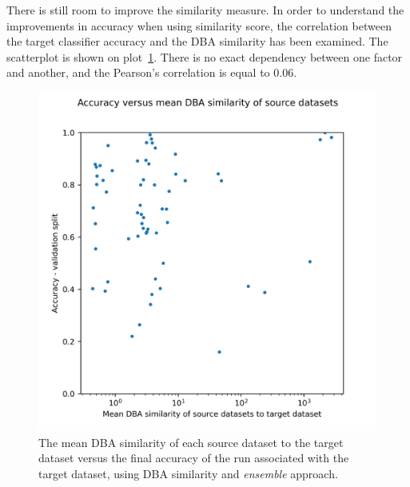 \documentclass[a4paper,11pt,twoside]{report}
\theoremstyle{definition}
\begin{document}
\FloatBarrier
There is still room to improve the similarity measure. In order to understand the improvements in accuracy when using similarity score, the correlation between the target classifier accuracy and the DBA similarity has been examined. The scatterplot is shown on plot~\ref{fig:acc_vs_dba_sim}. There is no exact dependency between one factor and another, and the Pearson's correlation is equal to $0.06$.
\FloatBarrier
\begin{figure}[h!t]
\centering
\includegraphics[width=15cm]{imgs/ensemble/accuracy_vs_mean_dba_sim.png}
\caption{The mean DBA similarity of each source dataset to the target dataset versus the final accuracy of the run associated with the target dataset, using DBA similarity and \textit{ensemble} approach.}
\label{fig:acc_vs_dba_sim}
\end{figure}
\FloatBarrier
\end{document}

